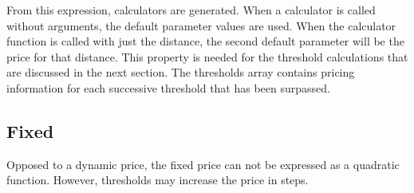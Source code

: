 




From this expression, calculators are generated. When a calculator is called without arguments, the default parameter values are used. When the calculator function is called with just the distance, the second default parameter will be the price for that distance. This property is needed for the threshold calculations that are discussed in the next section. The thresholds array contains pricing information for each successive threshold that has been surpassed.

\subsection{Fixed}
Opposed to a dynamic price, the fixed price can not be expressed as a quadratic function. However, thresholds may increase the price in steps.



